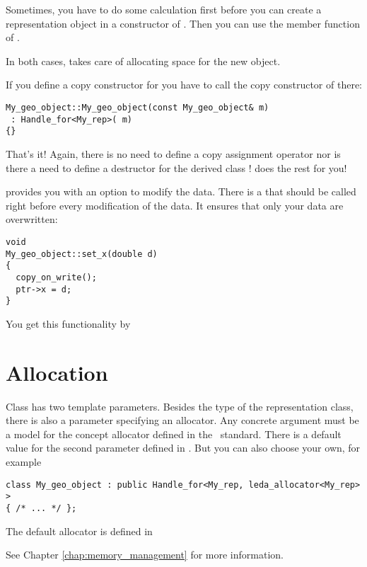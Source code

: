 Sometimes, you have to do some calculation first before you can
create a representation object in a constructor of .
\def\ccIndexClassName{Handle_for}
Then you can use the %
 member function
of . 

In both cases,  takes care of allocating space for
the new object. 

If you define a copy constructor for  
you have to call the copy constructor of  there:

\begin{verbatim}
My_geo_object::My_geo_object(const My_geo_object& m)
 : Handle_for<My_rep>( m) 
{}
\end{verbatim}

That's it! Again, there is no need to define a copy assignment operator 
nor is there a need to define a destructor for the derived class 
!   does the rest for you!

 provides you with an option to modify the data. There is
a  
that should be called right before every modification of the data. 
It ensures that only your data are overwritten: 

\begin{verbatim}
void 
My_geo_object::set_x(double d)
{
  copy_on_write();
  ptr->x = d;
}
\end{verbatim}
You get this functionality by


\section{Allocation}
Class  has two template parameters. Besides the
type of the representation class, there is also a parameter specifying an
allocator.
Any concrete argument must be a model for the concept allocator
defined in the \CC\ standard. There is a default value for the second
parameter defined in . But you can also choose your
own, for example

\begin{verbatim}
class My_geo_object : public Handle_for<My_rep, leda_allocator<My_rep> > 
{ /* ... */ };
\end{verbatim}

The default allocator is defined in


See Chapter \ref{chap:memory_management} for more information.

